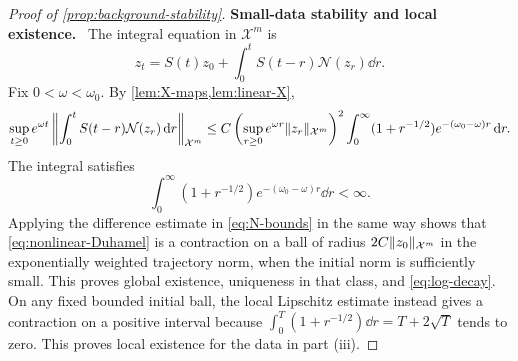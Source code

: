 \documentclass[11pt,reqno]{amsart}
\numberwithin{equation}{section}
\theoremstyle{plain}
\theoremstyle{remark}
\DeclarePairedDelimiter{\norm}{\lVert}{\rVert}
\newcommand{\parheading}[1]{\par\medskip\noindent\textbf{#1}\ }
\newcommand{\Xspace}{\mathcal X}
\begin{document}
\begin{proof}[Proof of \cref{prop:background-stability}]
\parheading{Small-data stability and local existence.}
The integral equation in $\Xspace^m$ is
\begin{equation}\label{eq:nonlinear-Duhamel}
 z_t=S(t)z_0+\int_0^tS(t-r)\mathcal N(z_r)\dd r.
\end{equation}
Fix $0<\omega<\omega_0$. By \cref{lem:X-maps,lem:linear-X},
\begin{equation}\label{eq:nonlinear-weighted-bound}
 \sup_{t\ge0}e^{\omega t}
 \left\|\int_0^tS(t-r)\mathcal N(z_r)\dd r\right\|_{\Xspace^m}
 \le C\left(\sup_{r\ge0}e^{\omega r}\norm{z_r}_{\Xspace^m}\right)^2
       \int_0^\infty(1+r^{-1/2})e^{-(\omega_0-\omega)r}\dd r.
\end{equation}
The integral satisfies
\begin{equation}\label{eq:nonlinear-integrability}
 \int_0^\infty (1+r^{-1/2})e^{-(\omega_0-\omega)r}\dd r<\infty.
\end{equation}
Applying the difference estimate in \eqref{eq:N-bounds} in the same way shows that \eqref{eq:nonlinear-Duhamel} is a contraction on a ball of radius $2C\norm{z_0}_{\Xspace^m}$ in the exponentially weighted trajectory norm, when the initial norm is sufficiently small. This proves global existence, uniqueness in that class, and \eqref{eq:log-decay}. On any fixed bounded initial ball, the local Lipschitz estimate instead gives a contraction on a positive interval because $\int_0^T(1+r^{-1/2})\dd r=T+2\sqrt T$ tends to zero. This proves local existence for the data in part (iii).


\end{proof}
\end{document}
